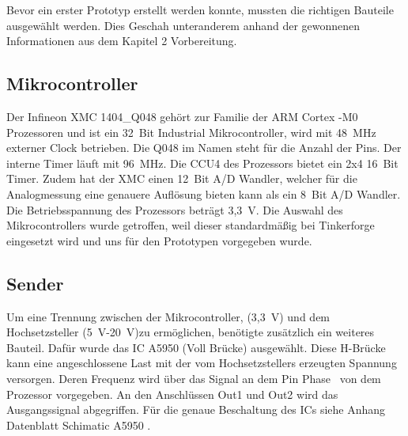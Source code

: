 Bevor ein erster Prototyp erstellt werden konnte, mussten die richtigen Bauteile ausgewählt werden. Dies Geschah unteranderem anhand der gewonnenen Informationen aus dem Kapitel 2 Vorbereitung. 

\subsection{Mikrocontroller}
Der Infineon XMC 1404\_Q048 gehört zur Familie der ARM Cortex -M0 Prozessoren und ist ein 32~Bit Industrial Mikrocontroller, wird mit 48~MHz externer Clock betrieben. Die Q048 im Namen steht für die Anzahl der Pins. Der interne Timer läuft mit 96~MHz. Die CCU4 des Prozessors bietet ein 2x4 16~Bit Timer. Zudem hat der XMC einen 12~Bit A/D Wandler, welcher für die Analogmessung eine genauere Auflösung bieten kann als ein 8~Bit A/D Wandler. Die Betriebsspannung des Prozessors beträgt 3,3~V. Die Auswahl des Mikrocontrollers wurde getroffen, weil dieser standardmäßig bei Tinkerforge eingesetzt wird und uns für den Prototypen vorgegeben wurde. 


\subsection{Sender}Um eine Trennung zwischen der Mikrocontroller, (3,3~V) und dem Hochsetzsteller (5~V-20~V)zu ermöglichen, benötigte zusätzlich ein weiteres Bauteil. Dafür wurde das IC A5950 (Voll Brücke) ausgewählt. Diese H-Brücke kann eine angeschlossene Last mit der vom Hochsetzstellers erzeugten Spannung versorgen. Deren Frequenz wird über das Signal an dem Pin \glqq Phase \grqq~von dem Prozessor vorgegeben. An den Anschlüssen Out1 und Out2 wird das Ausgangssignal abgegriffen. Für die genaue Beschaltung des ICs siehe Anhang Datenblatt  \glqq Schimatic A5950 \grqq.




